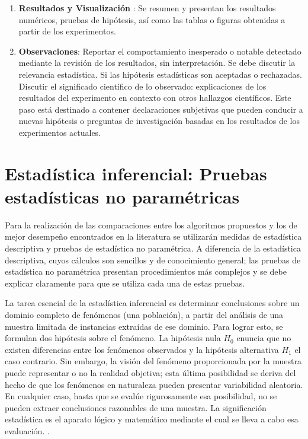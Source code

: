 \begin{enumerate}
	\item \textbf{Resultados y Visualización }: Se resumen y presentan los resultados numéricos, pruebas de hipótesis, así como las tablas o figuras obtenidas a partir de los experimentos.
	\item \textbf{Observaciones}: Reportar el comportamiento inesperado o notable detectado mediante la revisión de los resultados, sin interpretación. Se debe discutir la relevancia estadística. Si las hipótesis estadísticas son aceptadas o rechazadas. Discutir el significado científico de lo observado: explicaciones de los resultados del experimento en contexto con otros hallazgos científicos. Este paso está destinado a contener declaraciones subjetivas que pueden conducir a nuevas hipótesis o preguntas de investigación basadas en los resultados de los experimentos actuales.
\end{enumerate}

\section{Estadística inferencial: Pruebas estadísticas no paramétricas}
Para la realización de las comparaciones entre los algoritmos propuestos y los de mejor desempeño encontrados en la literatura se utilizarán medidas de estadística  descriptiva y pruebas de estadística no paramétrica. A diferencia de la estadística descriptiva, cuyos cálculos son sencillos y de conocimiento general; las pruebas de estadística no paramétrica presentan procedimientos más complejos y se debe explicar claramente para que se utiliza cada una de estas pruebas.

La tarea esencial de la estadística inferencial es determinar conclusiones sobre un dominio completo de fenómenos (una población), a partir del análisis de una muestra limitada de instancias extraídas de ese dominio. Para lograr esto, se formulan dos hipótesis sobre el fenómeno. La hipótesis nula $H_0$ enuncia que no existen diferencias entre los fenómenos observados y la hipótesis alternativa $H_1$  el caso contrario. Sin embargo, la visión del fenómeno proporcionada por la muestra puede representar o no la realidad objetiva; esta última posibilidad se deriva del hecho de que los fenómenos en naturaleza pueden presentar variabilidad aleatoria. En cualquier caso, hasta que se evalúe rigurosamente esa posibilidad, no se pueden extraer conclusiones razonables de una muestra. La significación estadística es el aparato lógico y matemático mediante el cual se lleva a cabo esa evaluación. \cite{Lowry2004}.

